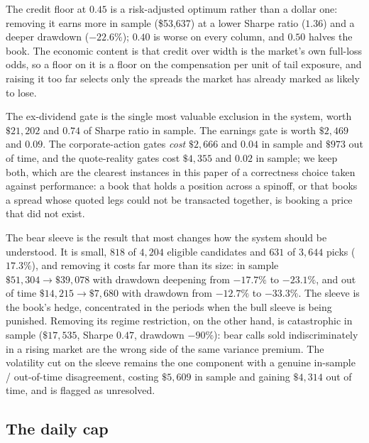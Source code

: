 \documentclass[11pt]{article}
\begin{document}
The credit floor at $0.45$ is a risk-adjusted optimum rather than a dollar one:
removing it earns more in sample (\$53{,}637) at a lower Sharpe ratio ($1.36$)
and a deeper drawdown ($-22.6\%$); $0.40$ is worse on every column, and $0.50$
halves the book. The economic content is that credit over width is the
market's own full-loss odds, so a floor on it is a floor on the compensation
per unit of tail exposure, and raising it too far selects only the spreads the
market has already marked as likely to lose.

The ex-dividend gate is the single most valuable exclusion in the system,
worth $\$21{,}202$ and $0.74$ of Sharpe ratio in sample. The earnings gate is
worth $\$2{,}469$ and $0.09$. The corporate-action gates \emph{cost}
$\$2{,}666$ and $0.04$ in sample and $\$973$ out of time, and the quote-reality
gates cost $\$4{,}355$ and $0.02$ in sample; we keep both, which are the
clearest instances in this paper of a correctness choice taken against
performance: a book that holds a position across a spinoff, or that books a
spread whose quoted legs could not be transacted together, is booking a price
that did not exist.

The bear sleeve is the result that most changes how the system should be
understood. It is small, $818$ of $4{,}204$ eligible candidates and $631$ of
$3{,}644$ picks ($17.3\%$), and removing it costs far more than its size: in
sample $\$51{,}304 \to \$39{,}078$ with drawdown deepening from $-17.7\%$ to
$-23.1\%$, and out of time $\$14{,}215 \to \$7{,}680$ with drawdown from
$-12.7\%$ to $-33.3\%$. The sleeve is the book's hedge, concentrated in the
periods when the bull sleeve is being punished. Removing its regime
restriction, on the other hand, is catastrophic in sample ($\$17{,}535$,
Sharpe $0.47$, drawdown $-90\%$): bear calls sold indiscriminately in a rising
market are the wrong side of the same variance premium. The volatility cut on
the sleeve remains the one component with a genuine in-sample / out-of-time
disagreement, costing $\$5{,}609$ in sample and gaining $\$4{,}314$ out of
time, and is flagged as unresolved.

\subsection{The daily cap}
\label{sec:cap}
\end{document}
